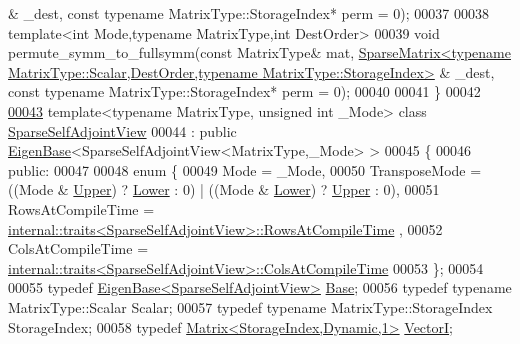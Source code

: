 \begin{DoxyCode}
      & \_dest, \textcolor{keyword}{const} \textcolor{keyword}{typename} MatrixType::StorageIndex* perm = 0);
00037 
00038 \textcolor{keyword}{template}<\textcolor{keywordtype}{int} Mode,\textcolor{keyword}{typename} MatrixType,\textcolor{keywordtype}{int} DestOrder>
00039 \textcolor{keywordtype}{void} permute\_symm\_to\_fullsymm(\textcolor{keyword}{const} MatrixType& mat, 
      \hyperlink{group___sparse_core___module_class_eigen_1_1_sparse_matrix}{SparseMatrix<typename MatrixType::Scalar,DestOrder,typename MatrixType::StorageIndex>}
      & \_dest, \textcolor{keyword}{const} \textcolor{keyword}{typename} MatrixType::StorageIndex* perm = 0);
00040 
00041 \}
00042 
\hyperlink{group___sparse_core___module}{00043} \textcolor{keyword}{template}<\textcolor{keyword}{typename} MatrixType, \textcolor{keywordtype}{unsigned} \textcolor{keywordtype}{int} \_Mode> \textcolor{keyword}{class }\hyperlink{group___sparse_core___module_class_eigen_1_1_sparse_self_adjoint_view}{SparseSelfAdjointView}
00044   : \textcolor{keyword}{public} \hyperlink{group___core___module_struct_eigen_1_1_eigen_base}{EigenBase}<SparseSelfAdjointView<MatrixType,\_Mode> >
00045 \{
00046   \textcolor{keyword}{public}:
00047     
00048     \textcolor{keyword}{enum} \{
00049       Mode = \_Mode,
00050       TransposeMode = ((Mode & \hyperlink{group__enums_gga39e3366ff5554d731e7dc8bb642f83cda6bcb58be3b8b8ec84859ce0c5ac0aaec}{Upper}) ? \hyperlink{group__enums_gga39e3366ff5554d731e7dc8bb642f83cda891792b8ed394f7607ab16dd716f60e6}{Lower} : 0) | ((Mode & \hyperlink{group__enums_gga39e3366ff5554d731e7dc8bb642f83cda891792b8ed394f7607ab16dd716f60e6}{Lower}) ? 
      \hyperlink{group__enums_gga39e3366ff5554d731e7dc8bb642f83cda6bcb58be3b8b8ec84859ce0c5ac0aaec}{Upper} : 0),
00051       RowsAtCompileTime = 
      \hyperlink{struct_eigen_1_1internal_1_1traits}{internal::traits<SparseSelfAdjointView>::RowsAtCompileTime}
      ,
00052       ColsAtCompileTime = 
      \hyperlink{struct_eigen_1_1internal_1_1traits}{internal::traits<SparseSelfAdjointView>::ColsAtCompileTime}
00053     \};
00054 
00055     \textcolor{keyword}{typedef} \hyperlink{group___core___module_struct_eigen_1_1_eigen_base}{EigenBase<SparseSelfAdjointView>} 
      \hyperlink{group___core___module_struct_eigen_1_1_eigen_base}{Base};
00056     \textcolor{keyword}{typedef} \textcolor{keyword}{typename} MatrixType::Scalar Scalar;
00057     \textcolor{keyword}{typedef} \textcolor{keyword}{typename} MatrixType::StorageIndex StorageIndex;
00058     \textcolor{keyword}{typedef} \hyperlink{group___core___module}{Matrix<StorageIndex,Dynamic,1>} \hyperlink{group___core___module}{VectorI};

\end{DoxyCode}
